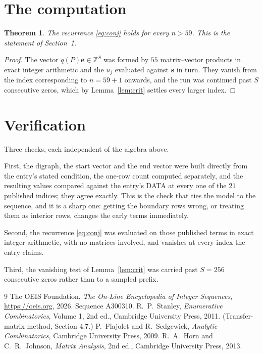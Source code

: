 \documentclass[11pt,a4paper]{article}
\theoremstyle{plain}
\newtheorem{theorem}{Theorem}
\theoremstyle{definition}
\begin{document}
\section{The computation}

\begin{theorem}
The recurrence \eqref{eq:conj} holds for every $n>59$. This is the statement of
Section~1.
\end{theorem}

\begin{proof}
The vector $q(P)\mathbf{e}\in\mathbb{Z}^{S}$ was formed by $55$ matrix--vector
products in exact integer arithmetic and the $u_j$ evaluated against $\mathbf{s}$ in turn.
They vanish from the index corresponding to $n=59+1$ onwards, and the run was continued
past $S$ consecutive zeros, which by Lemma~\ref{lem:crit} settles every larger index.
\end{proof}

\section{Verification}

Three checks, each independent of the algebra above.

First, the digraph, the start vector and the end vector were built directly from the
entry's stated condition, the one-row count computed separately, and the resulting values
compared against the entry's DATA at every one of the $21$ published indices; they
agree exactly. This is the check that ties the model to the sequence, and it is a sharp one:
getting the boundary rows wrong, or treating them as interior rows, changes the early terms
immediately.

Second, the recurrence \eqref{eq:conj} was evaluated on those published terms in exact
integer arithmetic, with no matrices involved, and vanishes at every index the entry claims.

Third, the vanishing test of Lemma~\ref{lem:crit} was carried past $S=256$ consecutive
zeros rather than to a sampled prefix.

\begin{thebibliography}{9}
 The OEIS Foundation, \emph{The On-Line Encyclopedia of Integer
Sequences}, \url{https://oeis.org}, 2026. Sequence A300310.
 R.~P.~Stanley, \emph{Enumerative Combinatorics}, Volume 1, 2nd ed.,
Cambridge University Press, 2011. (Transfer-matrix method, Section 4.7.)
 P.~Flajolet and R.~Sedgewick, \emph{Analytic Combinatorics}, Cambridge
University Press, 2009.
 R.~A.~Horn and C.~R.~Johnson, \emph{Matrix Analysis}, 2nd ed., Cambridge
University Press, 2013.
\end{thebibliography}
\end{document}
